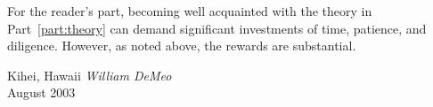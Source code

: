 For the reader's part, becoming well acquainted with the theory in
Part~\ref{part:theory} can demand significant investments of time, patience, and
diligence.  However, as noted above, the rewards are substantial.

\vspace{1cm}
\begin{flushright}\noindent
Kihei, Hawaii \hfill {\it William  DeMeo}\\
August 2003\hfill \\
\end{flushright}


